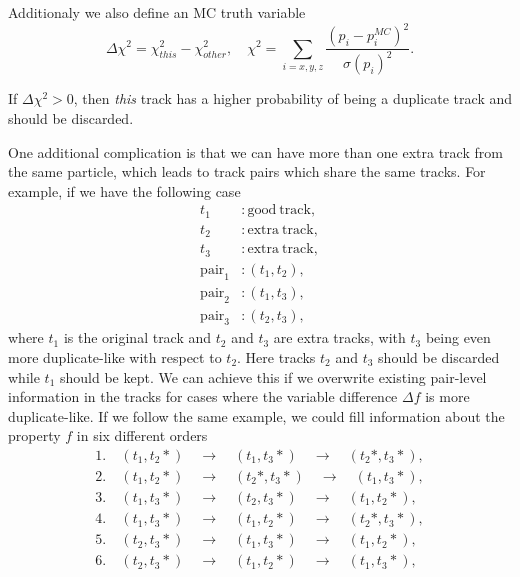 \documentclass[oneside,a4paper,openany,12pt]{scrbook}
\begin{document}
Additionaly we also define an MC truth variable 
\begin{equation}
\Delta \chi^2 = \chi^2_{this} - \chi^2_{other},\quad\chi^2 = \sum_{i=x,y,z}\frac{\left(p_i - p_i^{MC}\right)^2}{\sigma(p_i)^2}.
\end{equation}

If $\Delta \chi^2 > 0$, then \textit{this} track has a higher probability of being a duplicate track and should be discarded.

One additional complication is that we can have more than one extra track from the same particle, which leads to track pairs which share the same tracks. For example, if we have the following case
\begin{align*}
t_1&: \mathrm{good~track},\\
t_2&: \mathrm{extra~track},\\
t_3&: \mathrm{extra~track},\\
\mathrm{pair}_1&:\left(t_1,t_2\right),\\
\mathrm{pair}_2&:\left(t_1,t_3\right),\\
\mathrm{pair}_3&:\left(t_2,t_3\right),
\end{align*}
where $t_1$ is the original track and $t_2$ and $t_3$ are extra tracks, with $t_3$ being even more duplicate-like with respect to $t_2$. Here tracks $t_2$ and $t_3$ should be discarded while $t_1$ should be kept. We can achieve this if we overwrite existing pair-level information in the tracks for cases where the variable difference $\Delta f$ is more duplicate-like. If we follow the same example, we could fill information about the property $f$ in six different orders
\begin{align*}
1.&~\left(t_1,t_2*\right)\quad \to \quad \left(t_1,t_3*\right)\quad \to \quad \left(t_2*,t_3*\right),\\ 
2.&~\left(t_1,t_2*\right)\quad \to \quad \left(t_2*,t_3*\right)\quad \to \quad \left(t_1,t_3*\right),\\ 
3.&~\left(t_1,t_3*\right)\quad \to \quad \left(t_2,t_3*\right)\quad \to \quad \left(t_1,t_2*\right),\\
4.&~\left(t_1,t_3*\right)\quad \to \quad \left(t_1,t_2*\right)\quad \to \quad \left(t_2*,t_3*\right),\\
5.&~\left(t_2,t_3*\right)\quad \to \quad \left(t_1,t_3*\right)\quad \to \quad \left(t_1,t_2*\right),\\
6.&~\left(t_2,t_3*\right)\quad \to \quad \left(t_1,t_2*\right)\quad \to \quad \left(t_1,t_3*\right),
\end{align*}
\end{document}
